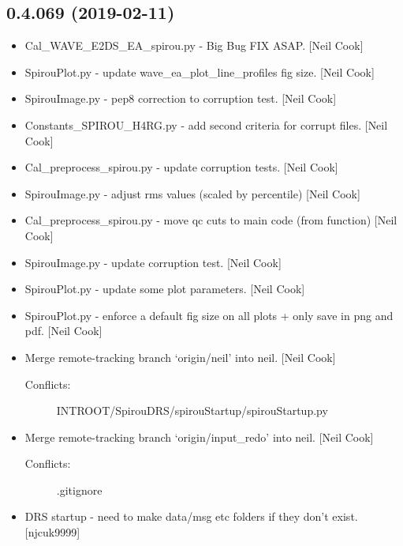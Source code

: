 \documentclass[a4paper,10pt,english]{report}
\begin{document}
\subsection{0.4.069 (2019-02-11)}
\label{\detokenize{misc/changelog:id187}}\begin{itemize}
\item {} 
Cal\_WAVE\_E2DS\_EA\_spirou.py - Big Bug FIX ASAP. {[}Neil Cook{]}

\item {} 
SpirouPlot.py - update wave\_ea\_plot\_line\_profiles fig size. {[}Neil
Cook{]}

\item {} 
SpirouImage.py - pep8 correction to corruption test. {[}Neil Cook{]}

\item {} 
Constants\_SPIROU\_H4RG.py - add second criteria for corrupt files.
{[}Neil Cook{]}

\item {} 
Cal\_preprocess\_spirou.py - update corruption tests. {[}Neil Cook{]}

\item {} 
SpirouImage.py - adjust rms values (scaled by percentile) {[}Neil Cook{]}

\item {} 
Cal\_preprocess\_spirou.py - move qc cuts to main code (from function)
{[}Neil Cook{]}

\item {} 
SpirouImage.py - update corruption test. {[}Neil Cook{]}

\item {} 
SpirouPlot.py - update some plot parameters. {[}Neil Cook{]}

\item {} 
SpirouPlot.py - enforce a default fig size on all plots + only save in
png and pdf. {[}Neil Cook{]}

\item {} 
Merge remote-tracking branch ‘origin/neil’ into neil. {[}Neil Cook{]}
\begin{description}
\item[{Conflicts:}] \leavevmode
INTROOT/SpirouDRS/spirouStartup/spirouStartup.py

\end{description}

\item {} 
Merge remote-tracking branch ‘origin/input\_redo’ into neil. {[}Neil
Cook{]}
\begin{description}
\item[{Conflicts:}] \leavevmode
.gitignore

\end{description}

\item {} 
DRS startup - need to make data/msg etc folders if they don’t exist.
{[}njcuk9999{]}

\end{itemize}
\end{document}
